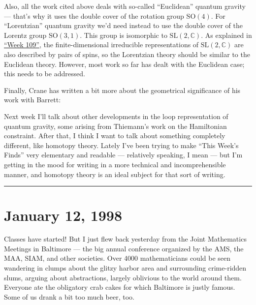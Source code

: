 \documentclass{article}
\def\tightlist{}
\renewcommand{\texttt}[1]{%
  \begingroup
  \ttfamily
  \begingroup\lccode`~=`/\lowercase{\endgroup\def~}{/\discretionary{}{}{}}%
  \begingroup\lccode`~=`[\lowercase{\endgroup\def~}{[\discretionary{}{}{}}%
  \begingroup\lccode`~=`.\lowercase{\endgroup\def~}{.\discretionary{}{}{}}%
  \catcode`/=\active\catcode`[=\active\catcode`.=\active
  \scantokens{#1\noexpand}%
  \endgroup
}
\begin{document}
Also, all the work cited above deals with so-called ``Euclidean''
quantum gravity --- that's why it uses the double cover of the rotation
group \(\mathrm{SO}(4)\). For ``Lorentzian'' quantum gravity we'd need
instead to use the double cover of the Lorentz group
\(\mathrm{SO}(3,1)\). This group is isomorphic to
\(\mathrm{SL}(2,\mathbb{C})\). As explained in
\protect\hyperlink{week109}{``Week 109''}, the finite-dimensional
irreducible representations of \(\mathrm{SL}(2,\mathbb{C})\) are also
described by pairs of spins, so the Lorentzian theory should be similar
to the Euclidean theory. However, most work so far has dealt with the
Euclidean case; this needs to be addressed.

Finally, Crane has written a bit more about the geometrical significance
of his work with Barrett:


Next week I'll talk about other developments in the loop representation
of quantum gravity, some arising from Thiemann's work on the Hamiltonian
constraint. After that, I think I want to talk about something
completely different, like homotopy theory. Lately I've been trying to
make ``This Week's Finds'' very elementary and readable --- relatively
speaking, I mean --- but I'm getting in the mood for writing in a more
technical and incomprehensible manner, and homotopy theory is an ideal
subject for that sort of writing.

\begin{center}\rule{0.5\linewidth}{0.5pt}\end{center}
\hypertarget{week114}{%
\section{January 12, 1998}\label{week114}}

Classes have started! But I just flew back yesterday from the Joint
Mathematics Meetings in Baltimore --- the big annual conference
organized by the AMS, the MAA, SIAM, and other societies. Over 4000
mathematicians could be seen wandering in clumps about the glitzy harbor
area and surrounding crime-ridden slums, arguing about abstractions,
largely oblivious to the world around them. Everyone ate the obligatory
crab cakes for which Baltimore is justly famous. Some of us drank a bit
too much beer, too.
\end{document}
